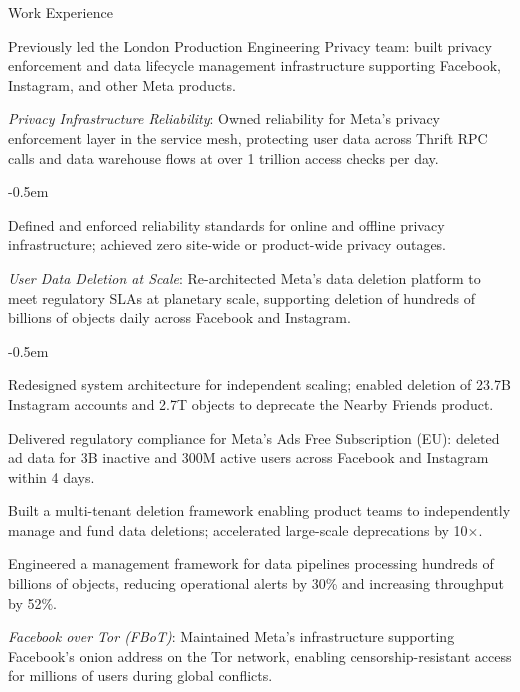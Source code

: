 \documentclass{resume} %
\begin{document}
\begin{rSection}{Work Experience}
\begin{rSubsection}{}{}{}{}{Previously led the London Production Engineering Privacy team: built privacy enforcement and data lifecycle management infrastructure supporting Facebook, Instagram, and other Meta products.}

\item {\em Privacy Infrastructure Reliability}:
Owned reliability for Meta's privacy enforcement layer in the service mesh, protecting user data across Thrift RPC calls and data warehouse flows at over 1 trillion access checks per day.

\begin{itemize}
\renewcommand\labelitemi{--}
{\small
\itemsep -0.5em
\item Defined and enforced reliability standards for online and offline privacy infrastructure; achieved zero site-wide or product-wide privacy outages.
}
\end{itemize}

\item {\em User Data Deletion at Scale}:
Re-architected Meta's data deletion platform to meet regulatory SLAs at planetary scale, supporting deletion of hundreds of billions of objects daily across Facebook and Instagram.

\begin{itemize}
\renewcommand\labelitemi{--}
{\small
\itemsep -0.5em
\item Redesigned system architecture for independent scaling; enabled deletion of 23.7B Instagram accounts and 2.7T objects to deprecate the Nearby Friends product.
\item Delivered regulatory compliance for Meta's Ads Free Subscription (EU): deleted ad data for 3B inactive and 300M active users across Facebook and Instagram within 4 days.
\item Built a multi-tenant deletion framework enabling product teams to independently manage and fund data deletions; accelerated large-scale deprecations by 10$\times$.
\item Engineered a management framework for data pipelines processing hundreds of billions of objects, reducing operational alerts by 30\% and increasing throughput by 52\%.
}
\end{itemize}

\item {\em Facebook over Tor (FBoT)}:
Maintained Meta's infrastructure supporting Facebook's onion address on the Tor network, enabling censorship-resistant access for millions of users during global conflicts.


\end{rSubsection}
\end{rSection}
\end{document}
